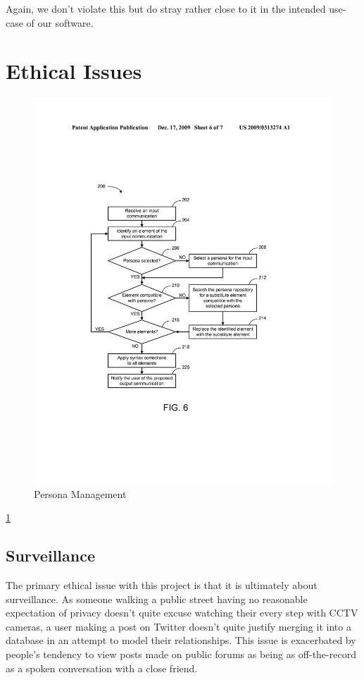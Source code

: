 Again, we don't violate this but do stray rather close to it in the intended use-case of our software.

\section{Ethical Issues}

\begin{figure}[htbp]
	\centering
	\includegraphics[width=0.7\linewidth]{img/persona_management_flow.png}
	\caption{Persona Management}
	\label{fig:persona_management_workflow}
\end{figure}

\ref{fig:persona_management_workflow}

\subsection{Surveillance}
The primary ethical issue with this project is that it is ultimately about surveillance. As someone walking a public street having no reasonable expectation of privacy doesn't quite excuse watching their every step with CCTV cameras, a user making a post on Twitter doesn't quite justify merging it into a database in an attempt to model their relationships. This issue is exacerbated by people's tendency to view posts made on public forums as being as off-the-record as a spoken conversation with a close friend.

